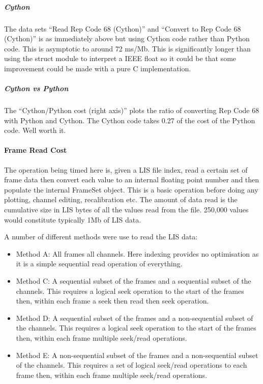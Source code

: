 \documentclass[letterpaper,10pt,english]{sphinxmanual}
\begin{document}
\subparagraph{Cython}
\label{\detokenize{tech/performance:cython}}
The data sets “Read Rep Code 68 (Cython)” and “Convert to Rep Code 68 (Cython)” is as immediately above but using Cython code rather than Python code. This is asymptotic to around 72 ms/Mb. This is significantly longer than using the struct module to interpret a IEEE float so it could be that some improvement could be made with a pure C implementation.


\subparagraph{Cython vs Python}
\label{\detokenize{tech/performance:cython-vs-python}}
The “Cython/Python cost (right axis)” plots the ratio of converting Rep Code 68 with Python and Cython. The Cython code takes 0.27 of the cost of the Python code. Well worth it.


\paragraph{Frame Read Cost}
\label{\detokenize{tech/performance:frame-read-cost}}
The operation being timed here is, given a LIS file index, read a certain set of frame data then convert each value to an internal floating point number and then populate the internal FrameSet object. This is a basic operation before doing any plotting, channel editing, recalibration etc. The amount of data read is the cumulative size in LIS bytes of all the values read from the file. 250,000 values would constitute typically 1Mb of LIS data.

A number of different methods were use to read the LIS data:
\begin{itemize}
\item {} 
Method A: All frames all channels. Here indexing provides no optimisation as it is a simple sequential read operation of everything.

\item {} 
Method C: A sequential subset of the frames and a sequential subset of the channels. This requires a logical seek operation to the start of the frames then, within each frame a seek then read then seek operation.

\item {} 
Method D: A sequential subset of the frames and a non-sequential subset of the channels. This requires a logical seek operation to the start of the frames then, within each frame multiple seek/read operations.

\item {} 
Method E: A non-sequential subset of the frames and a non-sequential subset of the channels. This requires a set of logical seek/read operations to each frame then, within each frame multiple seek/read operations.

\end{itemize}
\end{document}
